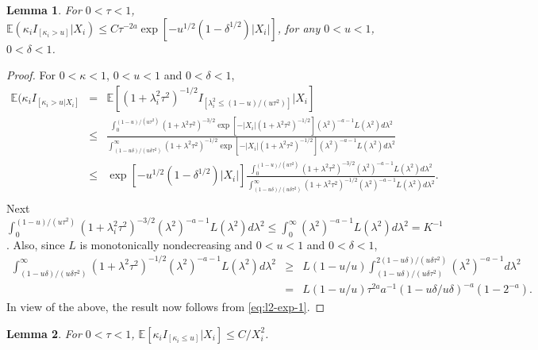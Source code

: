 \documentclass[sn-basic]{sn-jnl}%
\theoremstyle{thmstyleone}%
\newtheorem{lemma}{Lemma}[section]%
\begin{document}
\begin{lemma}\label{lem:exp2}
For $0<\tau<1$, $\mathbb{E}(\kappa_iI_{[\kappa_i>u]}|X_i)\leq C
\tau^{-2a}\exp[-u^{1/2}(1-\delta^{1/2})|X_i|]$, for any $0<u<1$, $0<\delta<1$.
\end{lemma}

\begin{proof}
For $0<\kappa<1$, $0<u<1$ and $0<\delta<1$,
\begin{eqnarray}
\mathbb{E}(\kappa_iI_{[\kappa_i>u|X_i]} & = & \mathbb{E}[(1+\lambda_i^2\tau^2)^{-1/2}
I_{[\lambda_i^2\leq (1-u)/(u\tau^2)]}|X_i]\nonumber\\ & \leq &
\frac{\int_{0}^{(1-u)/(u\tau^2)}(1+\lambda^2\tau^2)^{-3/2}
\exp[-|X_i|(1+\lambda^2\tau^2)^{-1/2}](\lambda^2)^{-a-1}L(\lambda^2)d\lambda^2}
{\int_{(1-u\delta)/(u\delta\tau^2)}^{\infty} (1+\lambda^2\tau^2)^{-1/2}
\exp[-|X_i|(1+\lambda^2\tau^2)^{-1/2}](\lambda^2)^{-a-1}L(\lambda^2)d\lambda^2}
\nonumber\\ & \leq & \exp[-u^{1/2}(1-\delta^{1/2})|X_i|]
\frac{\int_{0}^{(1-u)/(u\tau^2)}(1+\lambda^2\tau^2)^{-3/2}
(\lambda^2)^{-a-1}L(\lambda^2)d\lambda^2}
{\int_{(1-u\delta)/(u\delta\tau^2)}^{\infty}(1+\lambda^2\tau^2)^{-1/2}
(\lambda^2)^{-a-1}L(\lambda^2)d\lambda^2}.\nonumber\\
\label{eq:l2-exp-1}
\end{eqnarray}
Next $\int_{0}^{(1-u)/(u\tau^2)}(1+\lambda_i^2\tau^2)^{-3/2}
(\lambda^2)^{-a-1}L(\lambda^2)d\lambda^2\leq\int_{0}^{\infty}
(\lambda^2)^{-a-1}L(\lambda^2)d\lambda^2=K^{-1}$. Also, since $L$ is 
monotonically nondecreasing and $0<u<1$ and $0<\delta<1$,
\begin{eqnarray*}
\int_{(1-u\delta)/(u\delta\tau^2)}^{\infty}(1+\lambda^2\tau^2)^{-1/2}
(\lambda^2)^{-a-1}L(\lambda^2)d\lambda^2 & \geq & L(1-u/u)
\int_{(1-u\delta)/(u\delta\tau^2)}^{2(1-u\delta)/(u\delta\tau^2)}
(\lambda^2)^{-a-1}d\lambda^2
\nonumber\\ & = & L(1-u/u)\tau^{2a}a^{-1}(1-u\delta/u\delta)^{-a}(1-2^{-a}).
\end{eqnarray*}
In view of the above, the result now follows from \eqref{eq:l2-exp-1}.
\end{proof}


\begin{lemma}\label{lem:exp3}
For $0<\tau<1$, $\mathbb{E}[\kappa_i I_{[\kappa_i\leq u]}|X_i]\leq C/X_i^2$.
\end{lemma}
\end{document}
